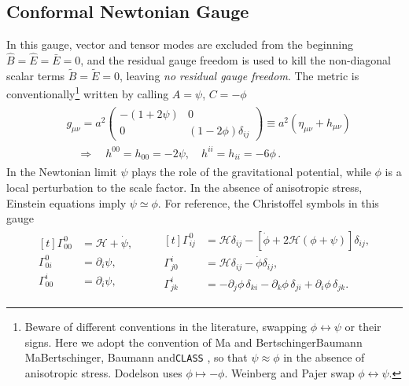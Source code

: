 \subsection{Conformal Newtonian Gauge}

In this gauge, vector and tensor modes are excluded from the beginning $\hat{B}=\hat{E}=\bar{E}=0$, and the residual gauge freedom is used to kill the non-diagonal scalar terms $\tilde{B}=\tilde{E}=0$, leaving \emph{no residual gauge freedom}.
The metric is conventionally\footnote{Beware of different conventions in the literature, swapping $\phi \leftrightarrow \psi$ or their signs. Here we adopt the convention of Ma and BertschingerBaumann MaBertschinger, Baumann \cite{Baumann_Cosmology_2022} and\texttt{CLASS} \cite{Lesgourgues_CosmicLinearAnisotropySolvingSystemCLASSIOverview_2011}, so that $\psi\approx \phi$ in the absence of anisotropic stress.
Dodelson \cite{DodelsonSchmidt_ModernCosmology_2025} uses $\phi\mapsto -\phi$. Weinberg \cite{Weinberg_AdiabaticModesCosmology_2003,Weinberg_Cosmology_2008} and Pajer swap $\phi\leftrightarrow \psi$.} written by calling $A=\psi$, $C=-\phi$
\begin{align}\label{eq:newtonian_gauge_metric}
\begin{aligned}
    &g_{\mu\nu}=a^2\begin{pmatrix}
        -(1+2\psi) & 0 \\
        0 & (1-2\phi)\delta_{ij}
    \end{pmatrix}\equiv a^2(\eta_{\mu\nu}+h_{\mu\nu})\\[5pt]
    &\quad \Rightarrow \quad h^{00}=h_{00}=-2\psi,\quad h^{ii}=h_{ii}=-6\phi\,.
\end{aligned}
\end{align}
%
In the Newtonian limit $\psi$ plays the role of the gravitational potential, while $\phi$ is a local perturbation to the scale factor.
In the absence of anisotropic stress, Einstein equations imply  $\psi\simeq \phi$.
%
For reference, the Christoffel symbols in this gauge
\begin{align}\label{eq:christoffel_newtonian_gauge}
    \begin{aligned}[t]
    \Gamma_{00}^{0} & =\mathcal{H}+\dot\psi,  \\
    \Gamma_{0 i}^{0} & =\partial_{i} \psi,  \\
    \Gamma_{00}^{i} & = \partial_{i} \psi,
    \end{aligned}
    \qquad
    \begin{aligned}[t]
    \Gamma_{i j}^{0} & =\mathcal{H} \delta_{i j}-\left[\dot\phi+2 \mathcal{H}(\phi+\psi)\right] \delta_{i j}, \\
    \Gamma_{j 0}^{i} & =\mathcal{H} \delta_{ij}-\dot\phi \delta_{ij}, \\
    \Gamma_{j k}^{i} & = -\partial_j \phi\, \delta_{ki} - \partial_k \phi\,\delta_{ji} + \partial_i \phi\,\delta_{jk}.
    \end{aligned}
\end{align}
